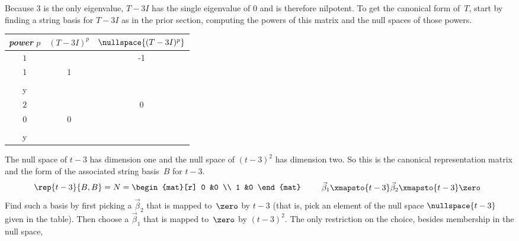 \begin{example}
Because $3$ is the only eigenvalue, 
$T-3I$ has the single eigenvalue of \( 0 \) and is therefore nilpotent.
To get the canonical form of~$T$, start by
finding a string basis for $T-3I$
as in the prior section, computing the powers of this matrix 
and the null spaces of those powers.
\begin{center}
  \begin{tabular}{c|cc}
    \multicolumn{1}{c}{\textit{power} \( p \)}  &\( (T-3I)^p \)  &\( \nullspace{(T-3I)^p}  \)   \\  
    \hline
    \( 1 \)
    &\(  
       \matrixvenlarge{\begin{mat}[r]
         -1  &-1 \\
         1   &1   \\
       \end{mat}}  \)
    &\( \set{\matrixvenlarge{\colvec{-y \\ y}}\suchthat
                               y\in\C}  \)   \\
    \( 2 \)
    &\(  
       \matrixvenlarge{\begin{mat}[r]
         0  &0  \\
         0  &0   \\
       \end{mat}}  \)
    &\( \set{\matrixvenlarge{\colvec{x \\ y}}\suchthat
                               x,y\in\C}  \)   \\
  \end{tabular}
\end{center}
The null space of $t-3$ has dimension one
and the null space of $(t-3)^2$ has dimension two.
So this is the canonical representation matrix and the form of the
associated string basis~$B$ for $t-3$.
\begin{equation*}
  \rep{t-3}{B,B}
  =N=
  \begin{mat}[r]
      0  &0   \\
      1  &0
  \end{mat}
  \qquad
  \begin{array}{r}
    \vec{\beta}_1\xmapsto{t-3}\vec{\beta}_2\xmapsto{t-3}\zero  \\
  \end{array}  
\end{equation*}
Find such a basis
by first picking a $\vec{\beta}_2$ that is mapped to~$\zero$
by $t-3$ (that is, pick an element of 
the null space $\nullspace{t-3}$ given in the table).
Then choose a $\vec{\beta}_1$ that is mapped to~$\zero$ by $(t-3)^2$.
The only restriction on the choice, besides membership in the null space,

\end{example}

